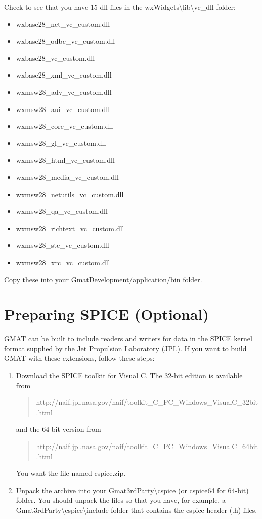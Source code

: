 \documentclass[letterpaper,10pt]{article}%
\begin{document}
\noindent Check to see that you have 15 dll files in the wxWidgets\textbackslash lib\textbackslash vc\_dll folder:
{\begin{itemize}\setlength{\itemsep}{0pt}
\item wxbase28\_net\_vc\_custom.dll
\item wxbase28\_odbc\_vc\_custom.dll
\item wxbase28\_vc\_custom.dll
\item wxbase28\_xml\_vc\_custom.dll
\item wxmsw28\_adv\_vc\_custom.dll
\item wxmsw28\_aui\_vc\_custom.dll
\item wxmsw28\_core\_vc\_custom.dll
\item wxmsw28\_gl\_vc\_custom.dll
\item wxmsw28\_html\_vc\_custom.dll
\item wxmsw28\_media\_vc\_custom.dll
\item wxmsw28\_netutils\_vc\_custom.dll
\item wxmsw28\_qa\_vc\_custom.dll
\item wxmsw28\_richtext\_vc\_custom.dll
\item wxmsw28\_stc\_vc\_custom.dll
\item wxmsw28\_xrc\_vc\_custom.dll
\end{itemize}}
  
\noindent Copy these into your GmatDevelopment/application/bin folder.

\section{Preparing SPICE (Optional)}

GMAT can be built to include readers and writers for data in the SPICE kernel format supplied by the Jet Propulsion Laboratory (JPL).  If you want to build GMAT with these extensions, follow these steps:

\begin{enumerate}
\item Download the SPICE toolkit for Visual C.  The 32-bit edition is available from
\begin{quote}
http://naif.jpl.nasa.gov/naif/toolkit\_C\_PC\_Windows\_VisualC\_32bit.html
\end{quote}
\noindent and the 64-bit version from
\begin{quote}
http://naif.jpl.nasa.gov/naif/toolkit\_C\_PC\_Windows\_VisualC\_64bit.html
\end{quote}
\noindent You want the file named cspice.zip.
\item Unpack the archive into your Gmat3rdParty\textbackslash cspice (or cspice64 for 64-bit) folder.  You should unpack the files so that you have, for example, a Gmat3rdParty\textbackslash cspice\textbackslash include folder that contains the cspice header (.h) files.  
\end{enumerate}
\end{document}
